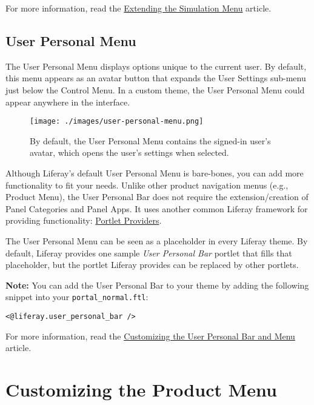 For more information, read the
\href{/docs/7-2/customization/-/knowledge_base/c/extending-the-simulation-menu}{Extending
the Simulation Menu} article.

\section{User Personal Menu}\label{user-personal-menu}

The User Personal Menu displays options unique to the current user. By
default, this menu appears as an avatar button that expands the User
Settings sub-menu just below the Control Menu. In a custom theme, the
User Personal Menu could appear anywhere in the interface.

\begin{figure}
\centering
\texttt{[image: ./images/user-personal-menu.png]}
\caption{By default, the User Personal Menu contains the signed-in
user's avatar, which opens the user's settings when selected.}
\end{figure}

Although Liferay's default User Personal Menu is bare-bones, you can add
more functionality to fit your needs. Unlike other product navigation
menus (e.g., Product Menu), the User Personal Bar does not require the
extension/creation of Panel Categories and Panel Apps. It uses another
common Liferay framework for providing functionality:
\href{/docs/7-2/frameworks/-/knowledge_base/f/embedding-portlets-in-themes}{Portlet
Providers}.

The User Personal Menu can be seen as a placeholder in every Liferay
theme. By default, Liferay provides one sample \emph{User Personal Bar}
portlet that fills that placeholder, but the portlet Liferay provides
can be replaced by other portlets.

\noindent\hrulefill

\textbf{Note:} You can add the User Personal Bar to your theme by adding
the following snippet into your \texttt{portal\_normal.ftl}:

\begin{verbatim}
<@liferay.user_personal_bar />
\end{verbatim}

\noindent\hrulefill

For more information, read the
\href{/docs/7-2/customization/-/knowledge_base/c/customizing-the-user-personal-bar-and-menu}{Customizing
the User Personal Bar and Menu} article.

\chapter{Customizing the Product
Menu}\label{customizing-the-product-menu}

